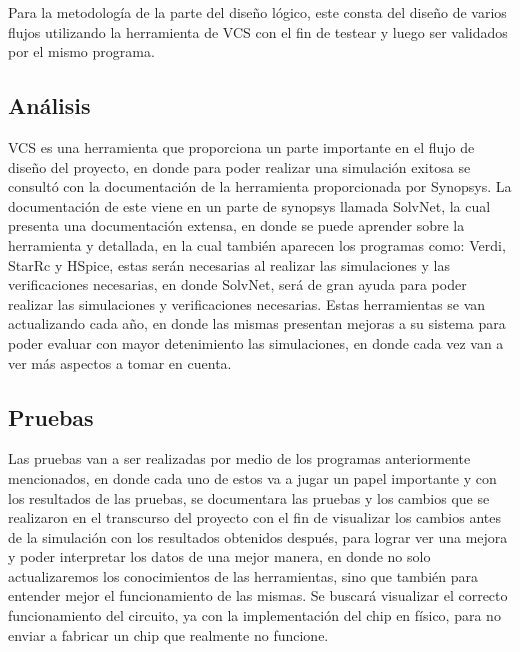 

Para la metodología de la parte del diseño lógico, este consta del diseño de varios flujos utilizando la herramienta de VCS con el fin de testear y luego ser validados por el mismo programa.

\subsection*{Análisis}
VCS es una herramienta que proporciona un parte importante en el flujo de diseño del proyecto, en donde para poder realizar una simulación exitosa se consultó con la documentación de la herramienta proporcionada por Synopsys.
La documentación de este viene en un parte de synopsys llamada SolvNet, la cual presenta una documentación extensa, en donde se puede aprender sobre la herramienta y detallada, en la cual también aparecen los programas como: Verdi, StarRc y HSpice, estas serán necesarias al realizar las simulaciones y las verificaciones necesarias, en donde SolvNet, será de gran ayuda para poder realizar las simulaciones y verificaciones necesarias.
Estas herramientas se van actualizando cada año, en donde las mismas presentan mejoras a su sistema para poder evaluar con mayor detenimiento las simulaciones, en donde cada vez van a ver más aspectos a tomar en cuenta.


\subsection*{Pruebas}
Las pruebas van a ser realizadas por medio de los programas anteriormente mencionados, en donde cada uno de estos va a jugar un papel importante y con los resultados de las pruebas, se documentara las pruebas y los cambios que se realizaron en el transcurso del proyecto con el fin de  visualizar los cambios antes de la simulación con los resultados obtenidos después, para lograr ver una mejora y poder interpretar los datos de una mejor manera, en donde no solo actualizaremos los conocimientos de las herramientas, sino que también para entender mejor el funcionamiento de las mismas. 
Se buscará visualizar el correcto funcionamiento del circuito, ya con la implementación del chip en físico, para no enviar a fabricar un chip que realmente no funcione.

